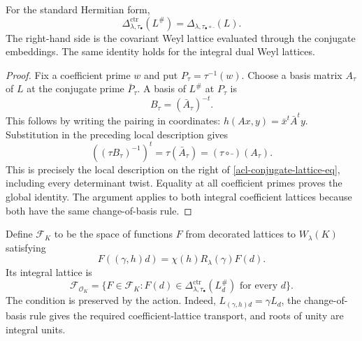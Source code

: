 \begin{lemma}
\label{acl-conjugate-lattice}
For the standard Hermitian form,
\begin{equation}\label{acl-conjugate-lattice-eq}
 \Delta_{\lambda,\tau_\bullet}^{\mathrm{ctr}}(L^\#)
                 =\Delta_{\lambda,\tau_\bullet\circ\bar{\ }}(L).
\end{equation}
The right-hand side is the covariant Weyl lattice evaluated
through the conjugate embeddings. The same identity holds
for the integral dual Weyl lattices.
\end{lemma}
\begin{proof}
Fix a coefficient prime $w$ and put $P_\tau=\tau^{-1}(w)$.
Choose a basis matrix $A_\tau$ of $L$ at the conjugate prime
$\bar P_\tau$. A basis of $L^\#$ at $P_\tau$ is
\[
                             B_\tau=(\bar A_\tau)^{-t}.
\]
This follows by writing the pairing in coordinates:
$h(Ax,y)=\bar x^t\bar A^ty$.
Substitution in the preceding local description gives
\[
        ((\tau B_\tau)^{-1})^t
                     =\tau(\bar A_\tau)
                     =(\tau\circ\bar{\ })(A_\tau).
\]
This is precisely the local description on the right of
\eqref{acl-conjugate-lattice-eq}, including every determinant
twist. Equality at all coefficient primes proves the global
identity. The argument applies to both integral coefficient
lattices because both have the same change-of-basis rule.
\end{proof}

Define $\mathcal F_K$ to be the space of functions $F$ from
decorated lattices to $W_\lambda(K)$ satisfying
\begin{equation}\label{acl-equivariant}
             F((\gamma,h)d)=\chi(h)R_\lambda(\gamma)F(d).
\end{equation}
Its integral lattice is
\[
 \mathcal F_{\mathcal O_K}
   =\{F\in\mathcal F_K:
             F(d)\in\Delta_{\lambda,\tau_\bullet}^{\mathrm{ctr}}(L_d^\#)
                                          \text{ for every }d\}.
\]
The condition is preserved by the action. Indeed,
$L_{(\gamma,h)d}=\gamma L_d$, the change-of-basis rule gives
the required coefficient-lattice transport, and roots of unity
are integral units.

